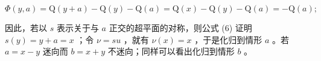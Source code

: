 \[
\Phi (y, a) = \mathrm{Q} (y + a) - \mathrm{Q} (y) - \mathrm{Q} (a) = \mathrm{Q} (x) - \mathrm{Q} (y) - \mathrm{Q} (a) = - \mathrm{Q} (a);
\]

因此，若以 \(s\) 表示关于与 \(a\) 正交的超平面的对称，则公式 (6) 证明 \(s(y) = y + a = x\) ；令 \(\nu = su\) ，就有 \(\nu(x) = x\) ，于是化归到情形 \(a\) 。若 \(a = x - y\) 迷向而 \(b = x + y\) 不迷向；同样可以看出化归到情形 \(b\) 。

